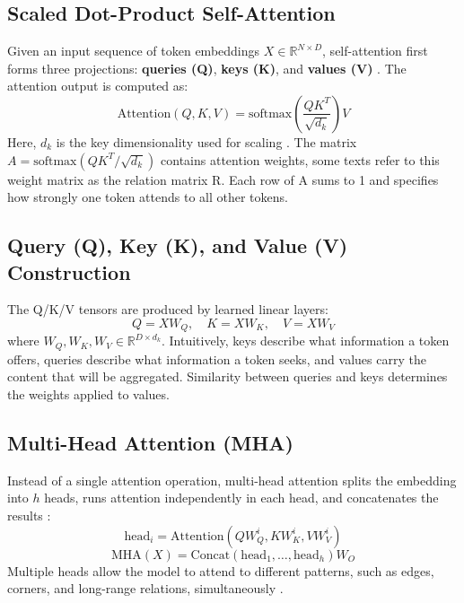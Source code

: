 \subsection{Scaled Dot-Product Self-Attention}
Given an input sequence of token embeddings $X \in \mathbb{R}^{N \times D}$, self-attention first forms three projections: \textbf{queries (Q)}, \textbf{keys (K)}, and \textbf{values (V)} \cite{vaswani2017attention}. The attention output is computed as:
\begin{equation}
    \text{Attention}(Q, K, V) = \text{softmax} \left( \frac{QK^T}{\sqrt{d_k}} \right) V
\end{equation}
Here, $d_k$ is the key dimensionality used for scaling . The matrix $A = \text{softmax}(QK^T / \sqrt{d_k})$ contains attention weights, some texts refer to this weight matrix as the relation matrix R. Each row of A sums to 1 and specifies how strongly one token attends to all other tokens.

\subsection{Query (Q), Key (K), and Value (V) Construction}
The Q/K/V tensors are produced by learned linear layers:
\begin{equation}
    Q = X W_Q, \quad K = X W_K, \quad V = X W_V
\end{equation}
where $W_Q, W_K, W_V \in \mathbb{R}^{D \times d_k}$. Intuitively, keys describe what information a token offers, queries describe what information a token seeks, and values carry the content that will be aggregated. Similarity between queries and keys determines the weights applied to values.

\subsection{Multi-Head Attention (MHA)}
Instead of a single attention operation, multi-head attention splits the embedding into $h$ heads, runs attention independently in each head, and concatenates the results \cite{vaswani2017attention}:
\begin{equation}
    \text{head}_i = \text{Attention}(QW_Q^i, KW_K^i, VW_V^i)
\end{equation}
\begin{equation}
    \text{MHA}(X) = \text{Concat}(\text{head}_1, \dots, \text{head}_h)W_O
\end{equation}
Multiple heads allow the model to attend to different patterns, such as edges, corners, and long-range relations, simultaneously \cite{vaswani2017attention}.

